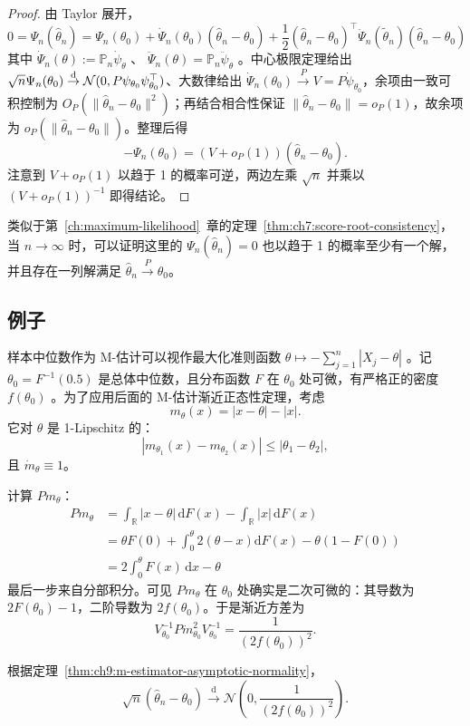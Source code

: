 \begin{proof}

由 Taylor 展开，\[0=\Psi_n(\widehat{\theta}_n)=\Psi_n(\theta_0)+\dot{\Psi}_n(\theta_0)(\widehat{\theta}_n-\theta_0)+\frac12(\widehat{\theta}_n-\theta_0)^\top\ddot{\Psi}_n(\widetilde{\theta}_n)(\widehat{\theta}_n-\theta_0)\]
其中 $\dot\Psi_n(\theta):=\mathbb P_n\dot\psi_{\theta}$ 、 $\ddot{\Psi}_n(\theta)=\mathbb P_n\ddot{\psi}_\theta$ 。中心极限定理给出 $\sqrt{n}\Psi_n(\theta_0)\overset{\rm d}\to \mathcal{N}(0,P\psi_{\theta_0}\psi_{\theta_0}^\top)$、大数律给出 $\dot{\Psi}_n(\theta_0)\overset{P}{\to} V=P\dot{\psi}_{\theta_0}$，余项由一致可积控制为 $O_P(\|\widehat{\theta}_n-\theta_0\|^2)$；再结合相合性保证 $\|\widehat{\theta}_n-\theta_0\|=o_P(1)$，故余项为 $o_P(\|\widehat{\theta}_n-\theta_0\|)$。整理后得
\[
-\Psi_n(\theta_0)=(V+o_P(1))(\widehat\theta_n-\theta_0).
\]
注意到 $V+o_P(1)$ 以趋于 1 的概率可逆，两边左乘 $\sqrt{n}$ 并乘以 $(V+o_P(1))^{-1}$ 即得结论。

\end{proof}

类似于第~\ref{ch:maximum-likelihood}~章的定理~\ref{thm:ch7:score-root-consistency}，当 $n\to \infty$ 时，可以证明这里的 $\Psi_n(\widehat{\theta}_n)=0$ 也以趋于 1 的概率至少有一个解，并且存在一列解满足 $\widehat\theta_n\overset P\to \theta_0$。

\subsection{例子}

\begin{example}[样本中位数的渐近正态性]\label{ex:ch9:median-asymptotic}
样本中位数作为 M-估计可以视作最大化准则函数 $\theta\mapsto -\sum_{j=1}^n|X_j-\theta|$ 。记 $\theta_0=F^{-1}(0.5)$ 是总体中位数，且分布函数 $F$ 在 $\theta_0$ 处可微，有严格正的密度 $f(\theta_0)$ 。为了应用后面的 M-估计渐近正态性定理，考虑
\[
m_\theta(x)=|x-\theta|-|x|.
\]
它对 $\theta$ 是 1-Lipschitz 的：
\[
|m_{\theta_1}(x)-m_{\theta_2}(x)|\leq|\theta_1-\theta_2|,
\]
且 $\dot{m}_\theta\equiv 1$。

计算 $Pm_\theta$：\[\begin{aligned} Pm_\theta &= \int_{\mathbb R} |x-\theta| \,\mathrm{d}F(x) - \int_{\mathbb R} |x| \,\mathrm{d}F(x) \\ &=\theta F(0)+\int_0^\theta2(\theta-x)\mathrm{d}F(x)-\theta(1-F(0))\\ &= 2\int_0^\theta F(x)\,\mathrm{d}x - \theta  \end{aligned}\]
最后一步来自分部积分。可见 $Pm_\theta$ 在 $\theta_0$ 处确实是二次可微的：其导数为 $2F(\theta_0)-1$，二阶导数为 $2f(\theta_0)$。于是渐近方差为
\[
V_{\theta_0}^{-1} P\dot{m}_{\theta_0}^2 V_{\theta_0}^{-1} = \frac{1}{(2f(\theta_0))^2}.
\]

根据定理~\ref{thm:ch9:m-estimator-asymptotic-normality}，
\[
\sqrt{n}(\widehat{\theta}_n - \theta_0) \overset{\mathrm{d}}{\to} \mathcal{N}\left(0, \frac{1}{(2f(\theta_0))^2}\right).
\]

\end{example}


